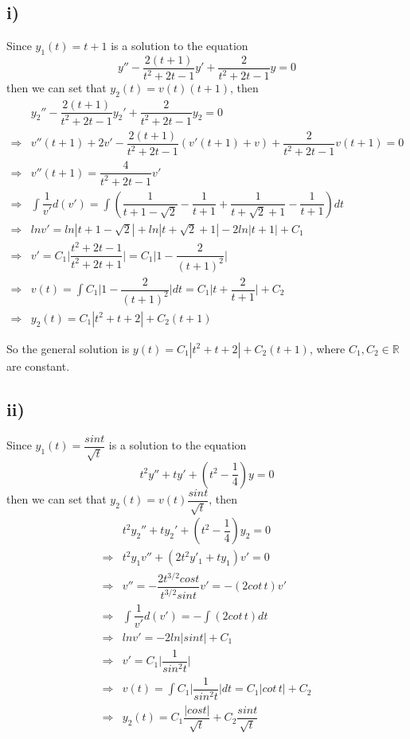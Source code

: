 \documentclass[a4paper,12pt,titlepage]{article}
\begin{document}
\subsection*{i)}
Since $y_1(t)=t+1$ is a solution to the equation
$$y''-\dfrac{2(t+1)}{t^2+2t-1}y'+\dfrac{2}{t^2+2t-1}y=0$$
then we can set that $y_2(t)=v(t)(t+1)$, then
\begin{align*}
&y_2''-\dfrac{2(t+1)}{t^2+2t-1}y_2'+\dfrac{2}{t^2+2t-1}y_2=0\\
\Rightarrow&v''(t+1)+2v'-\dfrac{2(t+1)}{t^2+2t-1}(v'(t+1)+v)+\dfrac{2}{t^2+2t-1}v(t+1)=0\\
\Rightarrow&v''(t+1)=\dfrac{4}{t^2+2t-1}v'\\
\Rightarrow&\int\dfrac{1}{v'}d(v')=\int(\dfrac{1}{t+1-\sqrt{2}}-\dfrac{1}{t+1}+\dfrac{1}{t+\sqrt{2}+1}-\dfrac{1}{t+1})dt\\
\Rightarrow& lnv'=ln|t+1-\sqrt{2}|+ln|t+\sqrt{2}+1|-2ln|t+1|+C_1\\
\Rightarrow&v'=C_1\Big|\dfrac{t^2+2t-1}{t^2+2t+1}\Big|=C_1\Big|1-\dfrac{2}{(t+1)^2}\Big|\\
\Rightarrow&v(t)=\int C_1\Big|1-\dfrac{2}{(t+1)^2}\Big|dt=C_1\Big|t+\dfrac{2}{t+1}\Big|+C_2\\
\Rightarrow&y_2(t)=C_1|t^2+t+2|+C_2(t+1)
\end{align*}

So the general solution is $y(t)=C_1|t^2+t+2|+C_2(t+1) $, where $C_1,C_2\in\mathbb{R}$ are constant.

\subsection*{ii)}
Since $y_1(t)=\dfrac{sint}{\sqrt{t}}$ is a solution to the equation
$$t^2y''+ty'+(t^2-\dfrac{1}{4})y=0$$
then we can set that $y_2(t)=v(t)\dfrac{sint}{\sqrt{t}}$, then
\begin{align*}
&t^2y_2''+ty_2'+(t^2-\dfrac{1}{4})y_2=0\\
\Rightarrow&t^2y_1v''+(2t^2y'_1+ty_1)v'=0\\
\Rightarrow&v''=-\dfrac{2t^{3/2}cost}{t^{3/2}sint}v'=-(2cot\,t)v'\\
\Rightarrow&\int\dfrac{1}{v'}d(v')=-\int(2cot\,t)dt\\
\Rightarrow& lnv'=-2ln|sint|+C_1\\
\Rightarrow&v'=C_1\Big|\dfrac{1}{sin^2t}\Big|\\
\Rightarrow&v(t)=\int C_1\Big|\dfrac{1}{sin^2t}\Big|dt=C_1|cot\,t|+C_2\\
\Rightarrow&y_2(t)=C_1\dfrac{|cost|}{\sqrt{t}}+C_2\dfrac{sint}{\sqrt{t}}
\end{align*}
\end{document}
